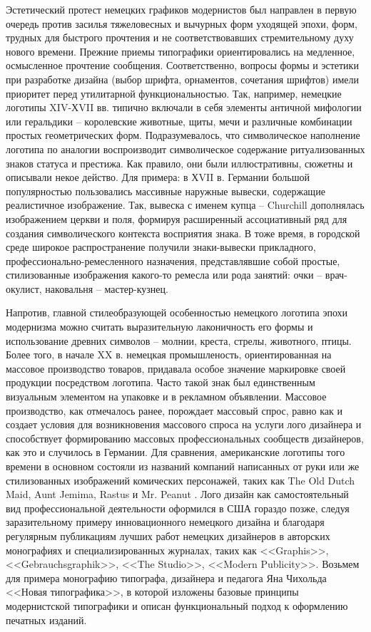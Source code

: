 Эстетический протест немецких графиков модернистов был направлен в первую очередь против засилья
тяжеловесных и вычурных форм уходящей эпохи, форм, трудных для быстрого прочтения и не
соответствовавших стремительному духу нового времени. Прежние приемы типографики ориентировались на
медленное, осмысленное прочтение сообщения. Соответственно, вопросы формы и эстетики при разработке
дизайна (выбор шрифта, орнаментов, сочетания шрифтов) имели приоритет перед утилитарной
функциональностью. Так, например, немецкие логотипы XIV-ХVII вв. типично включали в себя элементы
античной мифологии или геральдики -- королевские животные, щиты, мечи и различные комбинации простых
геометрических форм. Подразумевалось, что символическое наполнение логотипа по аналогии
воспроизводит символическое содержание ритуализованных знаков статуса и престижа. Как правило, они
были иллюстративны, сюжетны и описывали некое действо. Для примера: в ХVII в. Германии большой
популярностью пользовались массивные наружные вывески, содержащие реалистичное изображение. Так,
вывеска с именем купца -- Churchill дополнялась изображением церкви и поля, формируя расширенный
ассоциативный ряд для создания символического контекста восприятия знака. В тоже время, в городской
среде широкое распространение получили знаки-вывески прикладного, профессионально-ремесленного
назначения, представлявшие собой простые, стилизованные изображения какого-то ремесла или рода
занятий: очки -- врач-окулист, наковальня -- мастер-кузнец.

Напротив, главной стилеобразующей особенностью немецкого логотипа эпохи модернизма можно считать
выразительную лаконичность его формы и использование древних символов – молнии, креста, стрелы,
животного, птицы. Более того, в начале XX в. немецкая промышленость, ориентированная на массовое
производство товаров, придавала особое значение маркировке своей продукции посредством
логотипа. Часто такой знак был единственным визуальным элементом на упаковке и в рекламном
объявлении. Массовое производство, как отмечалось ранее, порождает массовый спрос, равно как и
создает условия для возникновения массового спроса на услуги лого дизайнера и способствует
формированию массовых профессиональных сообществ дизайнеров, как это и случилось в Германии. Для сравнения, американские логотипы того времени в
основном состояли из названий компаний написанных от руки или же стилизованных изображений
комических персонажей, таких как The Old Dutch Maid, Aunt Jemima, Rastus и
Mr. Peanut \autocite{link:mpr}. Лого дизайн как самостоятельный вид профессиональной деятельности
оформился в США гораздо позже, следуя заразительному примеру инновационного немецкого дизайна и
благодаря регулярным публикациям лучших работ немецких дизайнеров в авторских монографиях и
специализированных журналах, таких как <<Graphis>>, <<Gebrauchsgraphik>>, <<The Studio>>, <<Modern
Publicity>>\autocite{cabarga1982treasury}. Возьмем для примера монографию типографа, дизайнера и педагога Яна Чихольда <<Новая
типографика>>\autocite{chihold2011}, в которой изложены базовые принципы модернистской типографики и
описан функциональный подход к оформлению печатных изданий.

